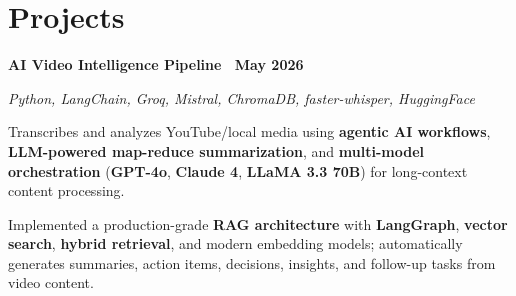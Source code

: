 \documentclass[letterpaper,9pt]{article}
\newcommand{\heading}[2]{
  \hspace{10pt}#1\hfill#2\\
}
\newcommand{\headingBf}[2]{
  \heading{\textbf{#1}}{\textbf{#2}}
}
\newcommand{\headingIt}[2]{
  \heading{\textit{#1}}{\textit{#2}}
}
\newenvironment{resume_list}{
  \vspace{-5pt}
  \begin{itemize}[itemsep=0px, parsep=1pt, leftmargin=30pt]
}{
  \end{itemize}
  \vspace{-4pt}
}
\begin{document}
  \section{Projects}
\vspace{-0.4em}

\vspace{0.1em}
  \headingBf{AI Video Intelligence Pipeline ~\normalfont\href{https://github.com/dheeraj-code1/video-rag-assistant}{\faGithub}}{May 2026}
    \vspace{-0.2em}
  \headingIt{Python, LangChain, Groq, Mistral, ChromaDB, faster-whisper, HuggingFace}{}
  \vspace{-0.1em}
  \begin{resume_list}
\item Transcribes and analyzes YouTube/local media using \textbf{agentic AI workflows}, \textbf{LLM-powered map-reduce summarization}, and \textbf{multi-model orchestration} (\textbf{GPT-4o}, \textbf{Claude 4}, \textbf{LLaMA 3.3 70B}) for long-context content processing.

\item Implemented a production-grade \textbf{RAG architecture} with \textbf{LangGraph}, \textbf{vector search}, \textbf{hybrid retrieval}, and modern embedding models; automatically generates summaries, action items, decisions, insights, and follow-up tasks from video content.
  \end{resume_list}
\end{document}
